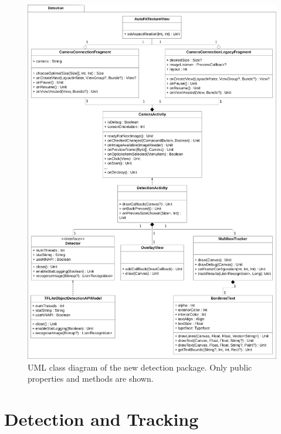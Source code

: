 \documentclass[
			   fontsize=11pt,
               paper=a4,
               bibliography=totoc,
               idxtotoc,
               headsepline,
               footsepline,
               footinclude=false,
               BCOR=12mm,
               DIV=13,
               openany,   %
               oneside    %
               ]
               {scrbook}
\begin{document}
\begin{figure}[h]
	\centering
	\includegraphics[width=\textwidth]{figures/uml_detection_package.png}
	\caption[UML Class Diagram of The New Detection Package]{UML class diagram of the new detection package. Only public properties and methods are shown.}
	\label{fig:umlDetectionPackage} %
\end{figure}


\section{Detection and Tracking}
\end{document}
